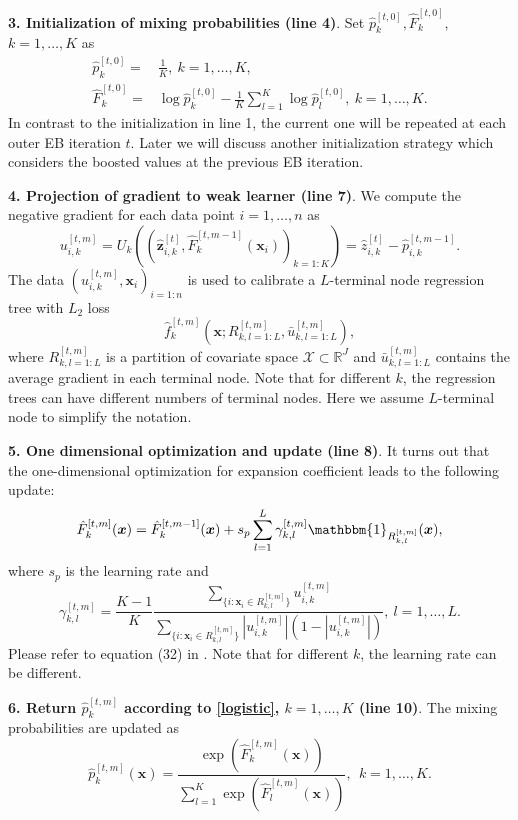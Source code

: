 \documentclass[11pt]{article}
\numberwithin{equation}{section}
\def\R{{\mathbb R}}  %
\def\bx{\boldsymbol{x}}
\def\bz{\boldsymbol{z}}
\begin{document}
{\bf 3. Initialization of mixing probabilities (line 4)}. 
Set $\hat{p}_k^{[t,0]},\hat{F}_{k}^{[t,0]}$, $k=1,\ldots,K$ as
		\begin{equation}\label{ini-1}			
			\begin{aligned}
			\hat{p}_k^{[t,0]}=&\frac{1}{K}, ~k=1,\ldots,K,\\
		\hat{F}_k^{[t,0]}=&\log \hat{p}_k^{[t,0]}-\frac{1}{K}\sum_{l=1}^K\log \hat{p}_l^{[t,0]}, ~ k=1,\ldots,K.
		\end{aligned}
	\end{equation}
		In contrast to the initialization in line 1, the current one will be repeated at each outer EB iteration $t$. 
		Later we will discuss another initialization strategy which considers the boosted values at the previous EB iteration.
		
{\bf 4. Projection of gradient to weak learner (line 7)}.
		We compute the negative gradient for each data point $i=1,\ldots,n$ as
		$$u_{i,k}^{[t,m]}=U_k\left(\left(\hat{\bz}_{i,k}^{[t]},\hat{F}_k^{[t,m-1]}(\bx_i)\right)_{k=1:K}\right)=\hat{z}_{i,k}^{[t]}-\hat{p}_{i,k}^{[t,m-1]}.$$
		The data $(u_{i,k}^{[t,m]},\bx_i)_{i=1:n}$ is used to calibrate a $L$-terminal node regression tree with $L_2$ loss $$\hat{f}_k^{[t,m]}\left(\bx;R^{[t,m]}_{k,l=1:L},\bar{u}^{[t,m]}_{k,l=1:L}\right),$$
		where $R^{[t,m]}_{k,l=1:L}$ is a partition of covariate space $\mathcal{X}\subset\R^J$ and $\bar{u}^{[t,m]}_{k,l=1:L}$ contains the average gradient in each terminal node.
		Note that for different $k$, the regression trees can have different numbers of terminal nodes. Here we assume $L$-terminal node to simplify the notation.
		
{\bf 5. One dimensional optimization and update (line 8)}.
 It turns out that  the one-dimensional optimization for expansion coefficient leads to the following update:
		$$\hat{F}_k^{[t,m]}(\bx)=\hat{F}_k^{[t,m-1]}(\bx)+s_p\sum_{l=1}^{L}\gamma^{[t,m]}_{k,l}\mathbbm{1}_{R^{[t,m]}_{k,l}}(\bx),$$
		where $s_p$ is the learning rate and
		$$\gamma^{[t,m]}_{k,l}=\frac{K-1}{K}\frac{\sum_{\{i:\bx_i\in R_{k,l}^{[t,m]}\}}u_{i,k}^{[t,m]}}{\sum_{\{i:\bx_i\in R_{k,l}^{[t,m]}\}}\left|u_{i,k}^{[t,m]}\right|\left(1-\left|u_{i,k}^{[t,m]}\right|\right)}, ~l=1,\ldots,L.$$
Please refer to equation (32) in \citet{friedman2001greedy}. Note that for different $k$, the learning rate can be different. 

{\bf 6. Return $\hat{p}_k^{[t,m]}$ according to \eqref{logistic}, $k=1,\ldots,K$ (line 10)}.
The mixing probabilities are updated as
$$\hat{p}_k^{[t,m]}(\bx)=\frac{\exp\left(\hat{F}^{[t,m]}_k(\bx)\right)}{\sum_{l=1}^{K}\exp\left(\hat{F}^{[t,m]}_l(\bx)\right)},~~ k=1,\ldots,K.$$
\end{document}
